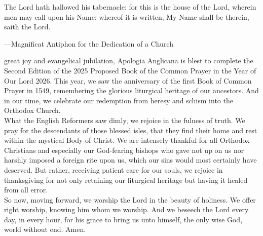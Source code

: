 {}
\par\noindent
\begin{quoting}
	The Lord hath hallowed his tabernacle: for this is the house of the Lord, wherein men may call upon his Name; whereof it is written, My Name shall be therein, saith the Lord.
	
	---Magnificat Antiphon for the Dedication of a Church
\end{quoting}

 great joy and evangelical jubilation, Apologia Anglicana is blest to complete the Second Edition of the 2025 Proposed Book of the Common Prayer in the Year of Our Lord 2026. This year, we saw the  anniversary of the first Book of Common Prayer in 1549, remembering the glorious liturgical heritage of our ancestors. And in our time, we celebrate our redemption from heresy and schism into the Orthodox Church.\\

What the English Reformers saw dimly, we rejoice in the fulness of truth. We pray for the descendants of those blessed isles, that they find their home and rest within the mystical Body of Christ. We are intensely thankful for all Orthodox Christians and especially our God-fearing bishops who gave not up on us nor harshly imposed a foreign rite upon us, which our sins would most certainly have deserved. But rather, receiving patient care for our souls, we rejoice in thanksgiving for not only retaining our liturgical heritage but having it healed from all error.\\

So now, moving forward, we worship the Lord in the beauty of holiness. We offer right worship, knowing him whom we worship. And we beseech the Lord every day, in every hour, for his grace to bring us unto himself, the only wise God, world without end. Amen.\\




\vspace{2\baselineskip}


